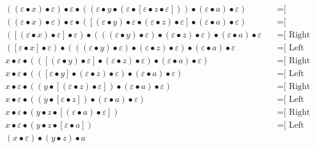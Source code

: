 \documentclass{article}
\begin{document}
\begin{align*}
((ε • x) • ε) • ε • ((ε • y • (ε • [ε • z • ε])) • (ε • a) • ε)
  & \quad \text{=[ Associativity ⟩}\\
((ε • x) • ε) • ε • ([(ε • y) • ε • (ε • z) • ε] • (ε • a) • ε)
  & \quad \text{=[ Associativity ⟩}\\
([(ε • x) • ε] • ε) • (((ε • y) • ε) • (ε • z) • ε) • (ε • a) • ε
  & \quad \text{=[ Right neutrality ⟩}\\
([ε • x] • ε) • (((ε • y) • ε) • (ε • z) • ε) • (ε • a) • ε
  & \quad \text{=[ Left neutrality ⟩}\\
x • ε • (([(ε • y) • ε] • (ε • z) • ε) • (ε • a) • ε)
  & \quad \text{=[ Right neutrality ⟩}\\
x • ε • (([ε • y] • (ε • z) • ε) • (ε • a) • ε)
  & \quad \text{=[ Left neutrality ⟩}\\
x • ε • ((y • [(ε • z) • ε]) • (ε • a) • ε)
  & \quad \text{=[ Right neutrality ⟩}\\
x • ε • ((y • [ε • z]) • (ε • a) • ε)
  & \quad \text{=[ Left neutrality ⟩}\\
x • ε • (y • z • [(ε • a) • ε])
  & \quad \text{=[ Right neutrality ⟩}\\
x • ε • (y • z • [ε • a])
  & \quad \text{=[ Left neutrality ⟩}\\
(x • ε) • (y • z) • a
\end{align*}
\end{document}
